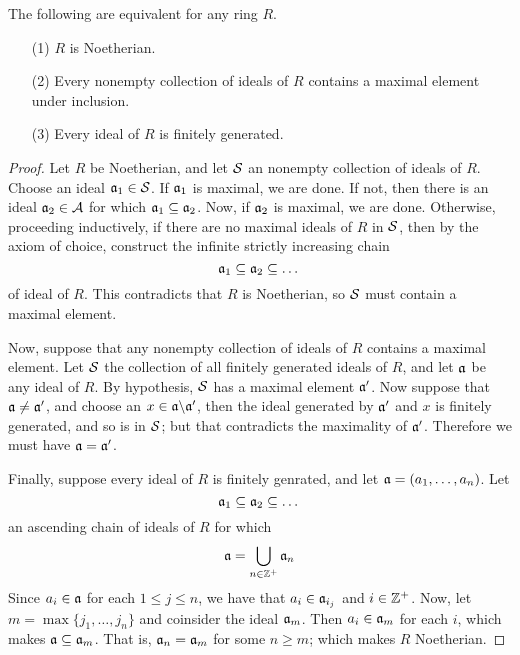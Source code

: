 \begin{theorem}\label{1.4.2}
    The following are equivalent for any ring $R$.
    \begin{enumerate}
        \item[(1)] $R$ is Noetherian.

        \item[(2)] Every nonempty collection of ideals of $R$ contains a maximal
            element under inclusion.

        \item[(3)] Every ideal of $R$ is finitely generated.
    \end{enumerate}
\end{theorem}
\begin{proof}
    Let $R$ be Noetherian, and let  $\mathcal{S}$ an nonempty collection of ideals of
    $R$. Choose an ideal  $\mathfrak{a}_1 \in \mathcal{S}$. If $\mathfrak{a}_1$ is maximal, we are done. If
    not, then there is an ideal $\mathfrak{a}_2 \in \mathcal{A}$ for which  $\mathfrak{a}_1 \subseteq \mathfrak{a}_2$.
    Now, if $\mathfrak{a}_2$ is maximal, we are done. Otherwise, proceeding inductively, if
    there are no maximal ideals of $R$ in $\mathcal{S}$, then by the axiom of choice,
    construct the infinite strictly increasing chain
    \begin{equation*}
         \mathfrak{a}_1 \subseteq \mathfrak{a}_2 \subseteq \dots
    \end{equation*}
    of ideal of $R$. This contradicts that  $R$ is Noetherian, so  $\mathcal{S}$ must
    contain a maximal element.

    Now, suppose that any nonempty collection of ideals of  $R$ contains
    a maximal element. Let  $\mathcal{S}$ the collection of all finitely generated
    ideals of $R$, and let $\mathfrak{a}$ be any ideal of  $R$. By hypothesis, $\mathcal{S}$ has a
    maximal element  $\mathfrak{a}'$. Now suppose that $\mathfrak{a} \neq \mathfrak{a}'$, and choose an
    $x \in \mathfrak{a} \backslash \mathfrak{a}'$, then the ideal generated by $\mathfrak{a}'$ and  $x$ is finitely
    generated, and so is in  $\mathcal{S}$; but that contradicts the maximality of  $\mathfrak{a}'$.
    Therefore we must have  $\mathfrak{a}=\mathfrak{a}'$.

    Finally, suppose every ideal of $R$ is finitely genrated, and let
    $\mathfrak{a}=(a_1, \dots, a_n)$. Let
    \begin{equation*}
        \mathfrak{a}_1 \subseteq \mathfrak{a}_2 \subseteq \dots
    \end{equation*}
    an ascending chain of ideals of $R$ for which
    \begin{equation*}
        \mathfrak{a}=\bigcup_{n \in \mathbb{Z}^+}{\mathfrak{a}_n}
    \end{equation*}
    Since $a_i \in \mathfrak{a}$ for each  $1 \leq j \leq n$, we have that  $a_i \in
    \mathfrak{a}_{i_j}$ and $i \in \mathbb{Z}^+$. Now, let  $m=\max{\{j_1, \dots, j_n\}}$ and
    coinsider the ideal $\mathfrak{a}_m$. Then  $a_i \in \mathfrak{a}_m$ for each $i$, which makes
    $\mathfrak{a} \subseteq \mathfrak{a}_m$. That is, $\mathfrak{a}_n=\mathfrak{a}_m$ for some  $n \geq m$; which
    makes $R$ Noetherian.
\end{proof}
